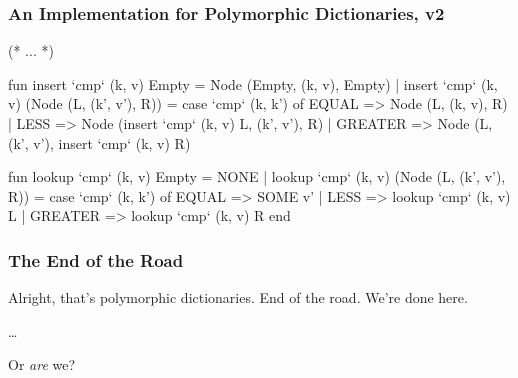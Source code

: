 \documentclass[aspectratio=169]{beamer}
\begin{document}
\begin{frame}[fragile]
  \frametitle{An Implementation for Polymorphic Dictionaries, v2}
  \small
  \begin{codeblock}
    (* ... *)

      fun insert `cmp` (k, v) Empty = Node (Empty, (k, v), Empty) 
        | insert `cmp` (k, v) (Node (L, (k', v'), R)) =
            case `cmp` (k, k') of
              EQUAL   => Node (L, (k, v), R)
            | LESS    => Node (insert `cmp` (k, v) L, (k', v'), R)
            | GREATER => Node (L, (k', v'), insert `cmp` (k, v) R) 

      fun lookup `cmp` (k, v) Empty = NONE 
        | lookup `cmp` (k, v) (Node (L, (k', v'), R)) =
            case `cmp` (k, k') of
              EQUAL   => SOME v' 
            | LESS    => lookup `cmp` (k, v) L
            | GREATER => lookup `cmp` (k, v) R
    end
  \end{codeblock}
\end{frame}

\begin{frame}[fragile]
  \frametitle{The End of the Road}

  Alright, that's polymorphic dictionaries. End of the road. We're done here.

  \dots 

  Or \textit{are} we?
\end{frame}
\end{document}
